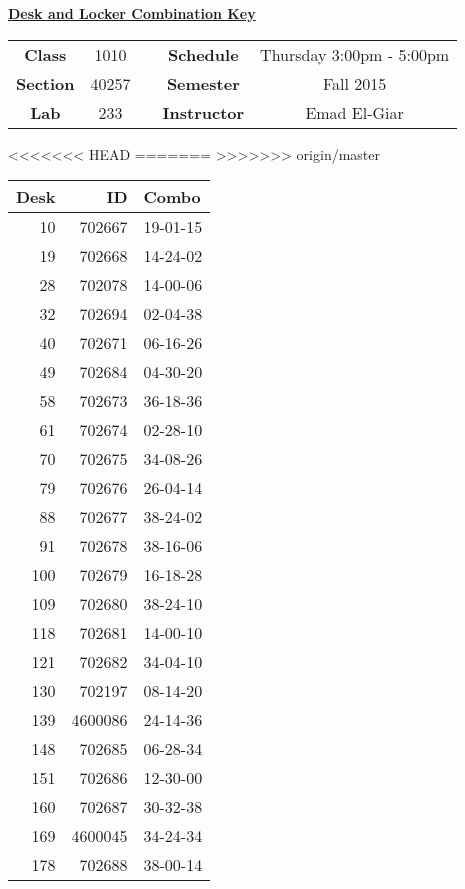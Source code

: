 \documentclass[12pt]{article}
\begin{document}
\thispagestyle{empty}

\begin{center}
	{\huge\textbf{\underline{ Desk and Locker Combination Key}}}
\end{center}


\begin{table}[h]
  \centering
  \begin{tabular}{ccccc}

  \textbf{Class} & 1010 & {\qquad} &\textbf{Schedule} & Thursday 3:00pm - 5:00pm \\
  \textbf{Section} & 40257 & {\qquad} & \textbf{Semester} & Fall 2015 \\
  \textbf{Lab} & 233 & {\qquad} & \textbf{Instructor} & Emad El-Giar \\
  \end{tabular}
\end{table}
<<<<<<< HEAD
 \vspace{0.1in}
=======
 \vspace{0.5in}
>>>>>>> origin/master
\begin{minipage}{0.4\textwidth}

\begin{tabular}{rrl}
\toprule
 Desk &       ID &     Combo \\
\midrule
   10 &   702667 &  19-01-15 \\
   19 &   702668 &  14-24-02 \\
   28 &   702078 &  14-00-06 \\
   32 &   702694 &  02-04-38 \\
   40 &   702671 &  06-16-26 \\
   49 &   702684 &  04-30-20 \\
   58 &   702673 &  36-18-36 \\
   61 &   702674 &  02-28-10 \\
   70 &   702675 &  34-08-26 \\
   79 &   702676 &  26-04-14 \\
   88 &   702677 &  38-24-02 \\
   91 &   702678 &  38-16-06 \\
  100 &   702679 &  16-18-28 \\
  109 &   702680 &  38-24-10 \\
  118 &   702681 &  14-00-10 \\
  121 &   702682 &  34-04-10 \\
  130 &   702197 &  08-14-20 \\
  139 &  4600086 &  24-14-36 \\
  148 &   702685 &  06-28-34 \\
  151 &   702686 &  12-30-00 \\
  160 &   702687 &  30-32-38 \\
  169 &  4600045 &  34-24-34 \\
  178 &   702688 &  38-00-14 \\
\bottomrule
\end{tabular}


\end{minipage}
\end{document}
